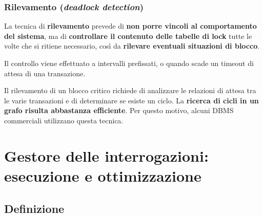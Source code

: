 \documentclass[a4paper]{article}
\begin{document}
	\subsubsection{Rilevamento (\emph{deadlock detection})}
	
	La tecnica di \textcolor{Red3}{\textbf{rilevamento}} prevede di \textbf{non porre vincoli al comportamento del sistema}, ma di \textbf{controllare il contenuto delle tabelle di lock} tutte le volte che si ritiene necessario, così da \textbf{rilevare eventuali situazioni di blocco}.\newline
	
	\noindent
	Il controllo viene effettuato a intervalli prefissati, o quando scade un timeout di attesa di una transazione.\newline
	
	\noindent
	Il rilevamento di un blocco critico richiede di analizzare le relazioni di attesa tra le varie transazioni e di determinare se esiste un ciclo. La \textbf{ricerca di cicli in un grafo risulta abbastanza efficiente}. Per questo motivo, alcuni DBMS commerciali utilizzano questa tecnica.\newpage
	
	\section{Gestore delle interrogazioni: esecuzione e ottimizzazione}
	
	\subsection{Definizione}
	
\end{document}
